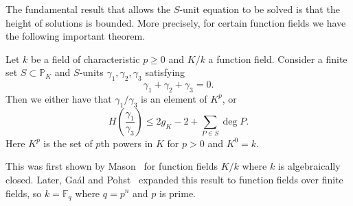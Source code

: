 The fundamental result that allows the \(S\)-unit equation to be solved is that the height of solutions is bounded. More precisely, for certain function fields we have the following important theorem.

\begin{theorem}%
  \label{thm:height-bound}
  Let \(k\) be a field of characteristic \(p \geq 0\) and \(K / k\) a function field. Consider a finite set \(S \subset \mathbb{P}_{K}\) and \(S\)-units \(\gamma_{1}, \gamma_{2}, \gamma_{3}\) satisfying
  \[\gamma_{1} + \gamma_{2} + \gamma_{3} = 0.\]
  Then we either have that \(\gamma_{1}/\gamma_{3}\) is an element of \(K^{p}\), or
  \[H\left(\frac{\gamma_{1}}{\gamma_{3}}\right) \leq 2g_{K} - 2 + \sum_{P \in S} \deg{P}.\]
  Here \(K^{p}\) is the set of \(p\)th powers in \(K\) for \(p > 0\) and \(K^{0} = k\).
\end{theorem}

This was first shown by Mason~\cite[Lemma 10]{mason-1984-diophantine-equations-over} for function fields \(K / k\) where \(k\) is algebraically closed. Later, Ga\'{a}l and Pohst~\cite{gaal-2006-diophantine-equations-over} expanded this result to function fields over finite fields, so \(k = \mathbb{F}_{q}\) where \(q = p^{n}\) and \(p\) is prime.
